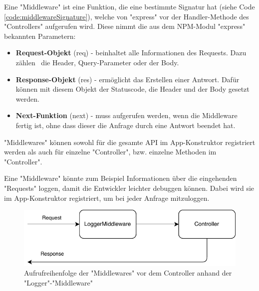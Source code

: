 \label{sec:middleware}

Eine "Middleware" ist eine Funktion, die eine bestimmte Signatur hat (siehe Code \ref{code:middlewareSignature}), welche von "express" vor der Handler-Methode des "Controllers" aufgerufen wird. 
Diese nimmt die aus dem NPM-Modul "express" bekannten Parametern:

    \begin{itemize}
        \item \textbf{Request-Objekt} ({\ttfamily req}) - beinhaltet alle Informationen des Requests. Dazu zählen \zb\ die Header, Query-Parameter oder der Body.
        \item \textbf{Response-Objekt} ({\ttfamily res}) - ermöglicht das Erstellen einer Antwort. Dafür können mit diesem Objekt der Statuscode, die Header und der Body gesetzt werden.
        \item \textbf{Next-Funktion} ({\ttfamily next}) - muss aufgerufen werden, wenn die Middleware fertig ist, ohne dass dieser die Anfrage durch eine Antwort beendet hat.
    \end{itemize}


"Middlewares" können sowohl für die gesamte API im App-Konstruktor registriert werden als auch für einzelne "Controller", bzw. einzelne Methoden im "Controller". 



Eine "Middleware" könnte zum Beispiel Informationen über die eingehenden "Requests" loggen, damit die Entwickler leichter debuggen können. Dabei wird sie im \linebreak App-Konstruktor registriert, um bei jeder Anfrage mitzuloggen. 

\begin{figure}[H]
    \centering
    \includegraphics{media/APITemplate/LogMiddleware.svg.pdf}
    \caption{Aufrufreihenfolge der "Middlewares" vor dem Controller anhand der "Logger"-"Middleware"} 
\end{figure}

